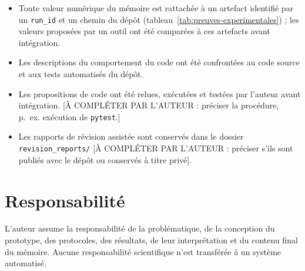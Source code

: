 \begin{itemize}
  \item Toute valeur numérique du mémoire est rattachée à un artefact
  identifié par un \texttt{run\_id} et un chemin du dépôt
  (tableau~\ref{tab:preuves-experimentales}) ; les valeurs proposées par un
  outil ont été comparées à ces artefacts avant intégration.
  \item Les descriptions du comportement du code ont été confrontées au code
  source et aux tests automatisés du dépôt.
  \item Les propositions de code ont été relues, exécutées et testées par
  l'auteur avant intégration. [À COMPLÉTER PAR L'AUTEUR : préciser la
  procédure, p.~ex. exécution de \texttt{pytest}.]
  \item Les rapports de révision assistée sont conservés dans le dossier
  \texttt{revision\_reports/} [À COMPLÉTER PAR L'AUTEUR : préciser s'ils sont
  publiés avec le dépôt ou conservés à titre privé].
\end{itemize}

\section*{Responsabilité}

L'auteur assume la responsabilité de la problématique, de la conception du
prototype, des protocoles, des résultats, de leur interprétation et du
contenu final du mémoire. Aucune responsabilité scientifique n'est transférée
à un système automatisé.
